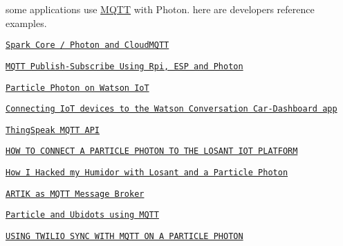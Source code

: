 some applications use \hyperlink{class_m_q_t_t}{M\+Q\+TT} with Photon. here are developer\textquotesingle{}s reference examples.
\begin{DoxyItemize}
\item \href{http://www.instructables.com/id/Spark-Core-Photon-and-CloudMQTT/}{\tt Spark Core / Photon and Cloud\+M\+Q\+TT}
\item \href{https://www.hackster.io/anasdalintakam/mqtt-publish-subscribe-using-rpi-esp-and-photon-864fe9#toc--particle-photon-as-mqtt-client-2}{\tt M\+Q\+TT Publish-\/\+Subscribe Using Rpi, E\+SP and Photon}
\item \href{http://www.kevinhoyt.com/2016/04/27/particle-photon-on-watson-iot/}{\tt Particle Photon on Watson IoT}
\item \href{https://developer.ibm.com/recipes/tutorials/connecting-a-iot-device-of-the-watson-conversation-cardashboard-app/}{\tt Connecting IoT devices to the Watson Conversation Car-\/\+Dashboard app}
\item \href{https://jp.mathworks.com/help/thingspeak/mqtt-api.html}{\tt Thing\+Speak M\+Q\+TT A\+PI}
\item \href{https://www.losant.com/blog/how-to-connect-a-particle-photon-to-the-losant-iot-platform}{\tt H\+OW TO C\+O\+N\+N\+E\+CT A P\+A\+R\+T\+I\+C\+LE P\+H\+O\+T\+ON TO T\+HE L\+O\+S\+A\+NT I\+OT P\+L\+A\+T\+F\+O\+RM}
\item \href{https://medium.com/@stevecaldwell/how-i-hacked-my-humidor-with-losant-and-a-particle-photon-84342744755b#.b68apdmo1}{\tt How I Hacked my Humidor with Losant and a Particle Photon}
\item \href{https://developer.artik.io/documentation/advanced-concepts/mqtt/color-mqtt.html}{\tt A\+R\+T\+IK as M\+Q\+TT Message Broker}
\item \href{https://ubidots.com/docs/devices/particleMQTT.html}{\tt Particle and Ubidots using M\+Q\+TT}
\item \href{https://www.twilio.com/docs/quickstart/sync-iot/mqtt-particle-photon-sync-iot}{\tt U\+S\+I\+NG T\+W\+I\+L\+IO S\+Y\+NC W\+I\+TH M\+Q\+TT ON A P\+A\+R\+T\+I\+C\+LE P\+H\+O\+T\+ON}
\end{DoxyItemize}

